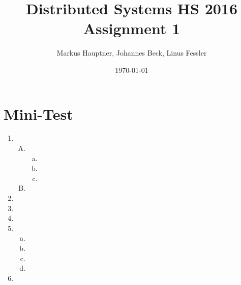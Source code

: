 \documentclass[11pt]{article}
\title{Distributed Systems HS 2016\\Assignment 1}
\author{Markus Hauptner, Johannes Beck, Linus Fessler}
\date{\today}
\begin{document}
\maketitle

\section{Mini-Test}

\begin{enumerate}
\item
	\begin{enumerate}[A)]
	\item 
		\begin{enumerate}[a)]
			\item 
			\item 
			\item 
		\end{enumerate}
	\item
	\end{enumerate}
\item
\item
\item
\item
	\begin{enumerate}[a)]
		\item 
		\item 
		\item 
		\item 
	\end{enumerate}
\item
\end{enumerate}
\end{document}
